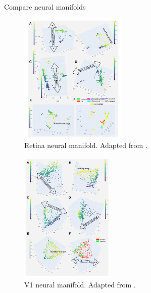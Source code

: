 \documentclass[xcolor={dvipsnames,svgnames}]{beamer}
\begin{document}
\begin{frame}{Compare neural manifolds}
        \begin{minipage}[t]{.45\linewidth}  
    \begin{figure}
            \includegraphics[width=0.45\textwidth]{presentation/embeddings/retina-manifold.PNG}
            \caption{Retina neural manifold. Adapted from \cite{dyballa_manifold_2021}.}
        \end{figure} 
    \end{minipage}
      \begin{minipage}[t]{.45\linewidth}   
      \begin{figure}         \includegraphics[width=0.4\textwidth]{presentation/embeddings/v1-manifold.PNG}
      \caption{V1 neural manifold. Adapted from \cite{dyballa_manifold_2021}.}
            \end{figure} 
    \end{minipage}
    

\end{frame}
\end{document}
